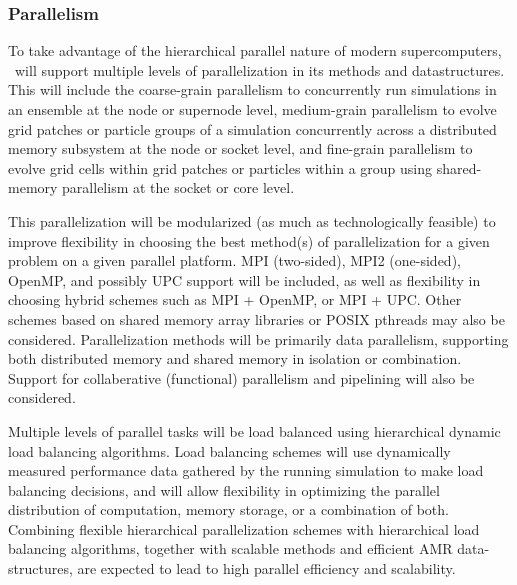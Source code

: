 \documentclass[11pt]{article}
\begin{document}
    \subsubsection{Parallelism} 


    To take advantage of the hierarchical parallel nature of modern
    supercomputers, \cello\ will support multiple levels of
    parallelization in its methods and datastructures.  This will
    include the coarse-grain parallelism to concurrently run
    simulations in an ensemble at the node or supernode level,
    medium-grain parallelism to evolve grid patches or particle groups
    of a simulation concurrently across a distributed memory subsystem
    at the node or socket level, and fine-grain parallelism to evolve
    grid cells within grid patches or particles within a group using
    shared-memory parallelism at the socket or core level.


    This parallelization will be modularized (as much as
    technologically feasible) to improve flexibility in choosing the
    best method(s) of parallelization for a given problem on a given
    parallel platform.  MPI (two-sided), MPI2 (one-sided), OpenMP, and
    possibly UPC support will be included, as well as flexibility in
    choosing hybrid schemes such as MPI + OpenMP, or MPI + UPC.  Other
    schemes based on shared memory array libraries or POSIX pthreads
    may also be considered.  Parallelization methods will be primarily
    data parallelism, supporting both distributed memory and shared
    memory in isolation or combination.  Support for collaberative
    (functional) parallelism and pipelining will also be considered.


    Multiple levels of parallel tasks will be load balanced using
    hierarchical dynamic load balancing algorithms.  Load balancing
    schemes will use dynamically measured performance data gathered by
    the running simulation to make load balancing decisions, and will
    allow flexibility in optimizing the parallel distribution of
    computation, memory storage, or a combination of both.  Combining
    flexible hierarchical parallelization schemes with hierarchical
    load balancing algorithms, together with scalable methods and
    efficient AMR data-structures, are expected to lead to high
    parallel efficiency and scalability.
\end{document}
